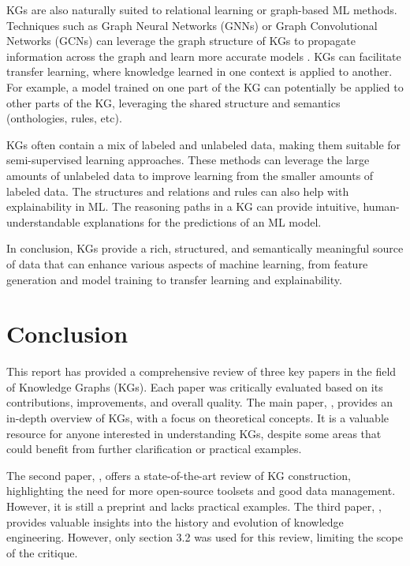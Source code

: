 \documentclass[11pt]{article} %
\begin{document}
KGs are also naturally suited to relational learning or graph-based ML methods. Techniques such as Graph Neural Networks (GNNs) or Graph Convolutional Networks (GCNs) can leverage the graph structure of KGs to propagate information across the graph and learn more accurate models \cite*{KG21}. KGs can facilitate transfer learning, where knowledge learned in one context is applied to another. For example, a model trained on one part of the KG can potentially be applied to other parts of the KG, leveraging the shared structure and semantics (onthologies, rules, etc).

KGs often contain a mix of labeled and unlabeled data, making them suitable for semi-supervised learning approaches. These methods can leverage the large amounts of unlabeled data to improve learning from the smaller amounts of labeled data. The structures and relations and rules can also help with explainability in ML. The reasoning paths in a KG can provide intuitive, human-understandable explanations for the predictions of an ML model.

In conclusion, KGs provide a rich, structured, and semantically meaningful source of data that can enhance various aspects of machine learning, from feature generation and model training \cite*{KG21} to transfer learning and explainability.

\section{Conclusion}

This report has provided a comprehensive review of three key papers in the field of Knowledge Graphs (KGs). Each paper was critically evaluated based on its contributions, improvements, and overall quality. The main paper,  \cite*{KG21}, provides an in-depth overview of KGs, with a focus on theoretical concepts. It is a valuable resource for anyone interested in understanding KGs, despite some areas that could benefit from further clarification or practical examples.

The second paper,  \cite*{CKG23}, offers a state-of-the-art review of KG construction, highlighting the need for more open-source toolsets and good data management. However, it is still a preprint and lacks practical examples. The third paper,  \cite*{KGKE22}, provides valuable insights into the history and evolution of knowledge engineering. However, only section 3.2 was used for this review, limiting the scope of the critique.
\end{document}
